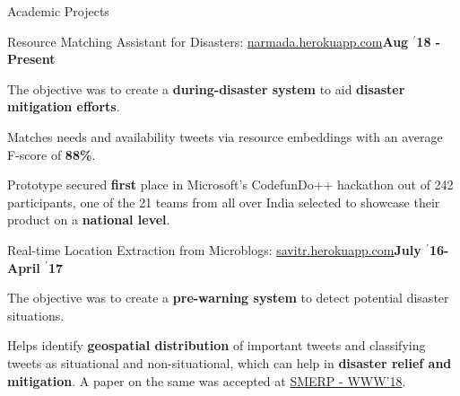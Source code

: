 \documentclass{resume} %
\begin{document}
\begin{rSection}{Academic Projects}
\vspace{-0.5em}
\begin{rSubsection}{ \large Resource Matching Assistant for Disasters: \href{http://narmada.herokuapp.com}{narmada.herokuapp.com}}{\textbf{\large Aug $^{\prime}$18 - Present}}{}{}
\item The objective was to create a \textbf{during-disaster system} to aid \textbf{disaster mitigation efforts}.
\item  Matches needs and availability tweets via resource embeddings with an average F-score of \textbf{88\%}.
\item Prototype secured \textbf{first} place in Microsoft's CodefunDo++ hackathon out of 242 participants, one of the 21 teams from all over India selected to showcase their product on a \textbf{national level}.
\end{rSubsection}


\vspace{-0.5em}
\begin{rSubsection}{ \large Real-time Location Extraction from Microblogs: \href{http://savitr.herokuapp.com}{savitr.herokuapp.com}}{\textbf{\large July $^{\prime}$16-April $^{\prime}$17}}{}{}
\item The objective was to create a \textbf{pre-warning system} to detect potential disaster situations. 
\item Helps identify \textbf{geospatial distribution} of important tweets and classifying tweets as situational and non-situational, which can help in \textbf{disaster relief and mitigation}. A paper on the same was accepted at \href{https://www.cse.iitk.ac.in/users/kripa/smerp2018/}{SMERP - WWW'18}.
\end{rSubsection}


\end{rSection}
\end{document}
